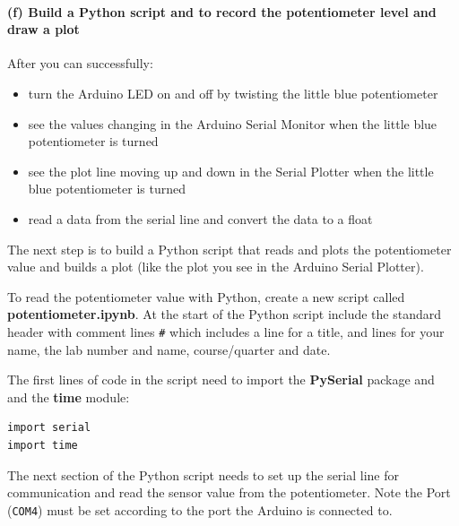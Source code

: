 \documentclass[11pt]{article}
\providecommand{\tightlist}{%
      \setlength{\itemsep}{0pt}\setlength{\parskip}{0pt}}
\begin{document}
    \hypertarget{f-build-a-python-script-and-to-record-the-potentiometer-level-and-draw-a-plot}{%
\paragraph{(f) Build a Python script and to record the potentiometer
level and draw a
plot}\label{f-build-a-python-script-and-to-record-the-potentiometer-level-and-draw-a-plot}}

After you can successfully:

\begin{itemize}
\tightlist
\item
  turn the Arduino LED on and off by twisting the little blue
  potentiometer
\item
  see the values changing in the Arduino Serial Monitor when the little
  blue potentiometer is turned
\item
  see the plot line moving up and down in the Serial Plotter when the
  little blue potentiometer is turned
\item
  read a data from the serial line and convert the data to a float
\end{itemize}

The next step is to build a Python script that reads and plots the
potentiometer value and builds a plot (like the plot you see in the
Arduino Serial Plotter).

To read the potentiometer value with Python, create a new script called
\textbf{potentiometer.ipynb}. At the start of the Python script include
the standard header with comment lines \texttt{\#} which includes a line
for a title, and lines for your name, the lab number and name,
course/quarter and date.

The first lines of code in the script need to import the
\textbf{PySerial} package and and the \textbf{time} module:

\begin{verbatim}
import serial
import time
\end{verbatim}

The next section of the Python script needs to set up the serial line
for communication and read the sensor value from the potentiometer. Note
the Port (\texttt{\textquotesingle{}COM4\textquotesingle{}}) must be set
according to the port the Arduino is connected to.
\end{document}
